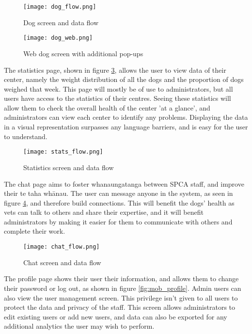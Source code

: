 \begin{figure}[!ht]
    \centering
    \texttt{[image: dog\_flow.png]}
    \caption{Dog screen and data flow}
    \label{fig:mob_dog}
\end{figure}

\begin{figure}[!ht]
    \centering
    \texttt{[image: dog\_web.png]}
    \caption{Web dog screen with additional pop-ups}
    \label{fig:web_dog}
\end{figure}

The statistics page, shown in figure \ref{fig:mob_stats}, allows the user to view data of their center, namely the weight distribution of all the dogs and the proportion of dogs weighed that week. This page will mostly be of use to administrators, but all users have access to the statistics of their centres. Seeing these statistics will allow them to check the overall health of the center 'at a glance', and administrators can view each center to identify any problems. Displaying the data in a visual representation surpasses any language barriers, and is easy for the user to understand.

\begin{figure}[!ht]
    \centering
    \texttt{[image: stats\_flow.png]}
    \caption{Statistics screen and data flow}
    \label{fig:mob_stats}
\end{figure}

The chat page aims to foster whanaungatanga between SPCA staff, and improve their te taha whānau. The user can message anyone in the system, as seen in figure \ref{fig:mob_chat}, and therefore build connections. This will benefit the dogs' health as vets can talk to others and share their expertise, and it will benefit administrators by making it easier for them to communicate with others and complete their work. 

\begin{figure}[!ht]
    \centering
    \texttt{[image: chat\_flow.png]}
    \caption{Chat screen and data flow}
    \label{fig:mob_chat}
\end{figure}

The profile page shows their user their information, and allows them to change their password or log out, as shown in figure \ref{fig:mob_profile}. Admin users can also view the user management screen. This privilege isn't given to all users to protect the data and privacy of the staff. This screen allows administrators to edit existing users or add new users, and data can also be exported for any additional analytics the user may wish to perform. 


